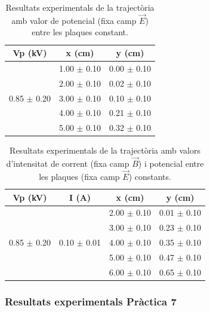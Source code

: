 \documentclass[11pt]{article}
\numberwithin{equation}{section}
\numberwithin{figure}{section}
\numberwithin{table}{section}
\begin{document}
\begin{table}[h!]
    \centering
    \caption{Resultats experimentals de la trajectòria amb valor de potencial (fixa camp $\vec{E}$) entre les plaques constant.}
    \begin{tabular}{|c|c|c|}
        \hline
        \textbf{Vp (kV)} & \textbf{x (cm)} & \textbf{y (cm)} \\
        \hline
         & 1.00 $\pm$ 0.10 & 0.00 $\pm$ 0.10 \\
         & 2.00 $\pm$ 0.10 & 0.02 $\pm$ 0.10 \\
        0.85 $\pm$ 0.20 & 3.00 $\pm$ 0.10 & 0.10 $\pm$ 0.10 \\
         & 4.00 $\pm$ 0.10 & 0.21 $\pm$ 0.10 \\
         & 5.00 $\pm$ 0.10 & 0.32 $\pm$ 0.10 \\
        \hline
    \end{tabular}
    
\end{table}

\begin{table}[h!]
    \centering
    \caption{Resultats experimentals de la trajectòria amb valors d'intensitat de corrent (fixa camp $\vec{B}$) i potencial entre les plaques (fixa camp $\vec{E}$) constants.}
    \begin{tabular}{|c|c|c|c|}
        \hline
        \textbf{Vp (kV)} & \textbf{I (A)} & \textbf{x (cm)} & \textbf{y (cm)} \\
        \hline
         &  & 2.00 $\pm$ 0.10 & 0.01 $\pm$ 0.10 \\
         &  & 3.00 $\pm$ 0.10 & 0.23 $\pm$ 0.10 \\
        0.85 $\pm$ 0.20 & 0.10 $\pm$ 0.01 & 4.00 $\pm$ 0.10 & 0.35 $\pm$ 0.10 \\
         &  & 5.00 $\pm$ 0.10 & 0.47 $\pm$ 0.10 \\
         &  & 6.00 $\pm$ 0.10 & 0.65 $\pm$ 0.10 \\
        \hline
    \end{tabular}
    
\end{table}

\subsubsection{Resultats experimentals Pràctica 7} \label{PR7_taules_dades_exp}
\end{document}
